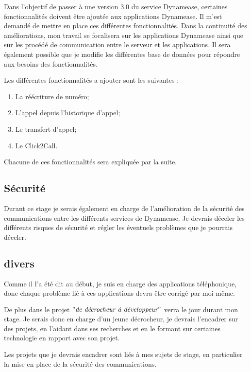 Dans l'objectif de passer à une version 3.0 du service Dynamease, certaines fonctionnalités doivent être ajoutée aux applications Dynamease. Il m'est demandé de mettre en place ces différentes fonctionnalités. Dans la continuité des améliorations, mon travail se focalisera sur les applications Dynamease ainsi que sur les procédé de communication entre le serveur et les applications. Il sera également possible que je modifie les différentes base de données pour répondre aux besoins des fonctionnalités.

Les différentes fonctionnalités a ajouter sont les suivantes :

\begin{enumerate}
	\item La réécriture de numéro;
	\item L'appel depuis l'historique d'appel;
	\item Le transfert d'appel;
	\item Le Click2Call.
\end{enumerate}

Chacune de ces fonctionnalités sera expliquée par la suite.

\subsection{Sécurité}

Durant ce stage je serais également en charge de l'amélioration de la sécurité des communications entre les différents services de Dynamease. Je devrais déceler les différents risques de sécurité et régler les éventuels problèmes que je pourrais déceler.

\subsection{divers}

Comme il l'a été dit au début, je suis en charge des applications téléphonique, donc chaque problème lié à ces applications devra être corrigé par moi même.

De plus dans le projet $"\textit{de décrocheur à développeur}"$ verra le jour durant mon stage. Je serais donc en charge d'un jeune décrocheur, je devrais l'encadrer sur des projets, en l'aidant dans ses recherches et en le formant sur certaines technologie en rapport avec son projet.

Les projets que je devrais encadrer sont liés à mes sujets de stage, en particulier la mise en place de la sécurité des communications.

